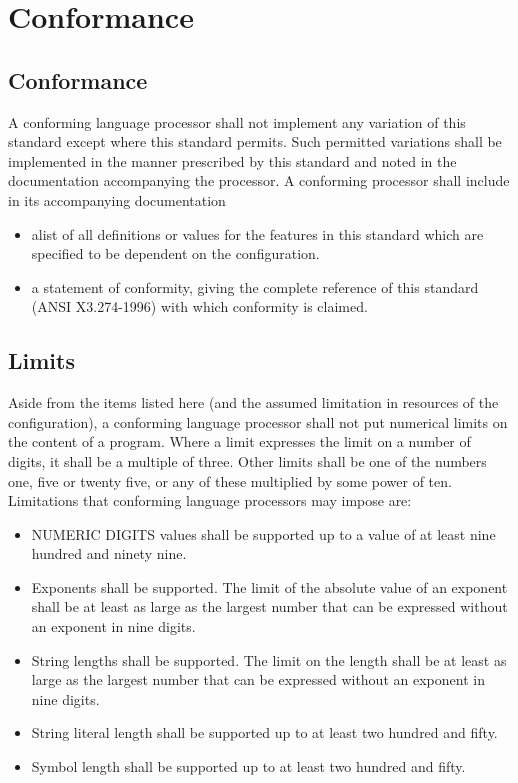 \hypertarget{conformance}{%
\chapter{Conformance}\label{conformance}}

\hypertarget{conformance-1}{%
\section{Conformance}\label{conformance-1}}

A conforming language processor shall not implement any variation of
this standard except where this standard permits. Such permitted
variations shall be implemented in the manner prescribed by this
standard and noted in the documentation accompanying the processor. A
conforming processor shall include in its accompanying documentation

\begin{itemize}
\item
  alist of all definitions or values for the features in this standard
  which are specified to be dependent on the configuration.
\item
  a statement of conformity, giving the complete reference of this
  standard (ANSI X3.274-1996) with which conformity is claimed.
\end{itemize}

\hypertarget{limits}{%
\section{Limits}\label{limits}}

Aside from the items listed here (and the assumed limitation in
resources of the configuration), a conforming language processor shall
not put numerical limits on the content of a program. Where a limit
expresses the limit on a number of digits, it shall be a multiple of
three. Other limits shall be one of the numbers one, five or twenty
five, or any of these multiplied by some power of ten. Limitations that
conforming language processors may impose are:

\begin{itemize}
\item
  NUMERIC DIGITS values shall be supported up to a value of at least
  nine hundred and ninety nine.
\item
  Exponents shall be supported. The limit of the absolute value of an
  exponent shall be at least as large as the largest number that can be
  expressed without an exponent in nine digits.
\item
  String lengths shall be supported. The limit on the length shall be at
  least as large as the largest number that can be expressed without an
  exponent in nine digits.
\item
  String literal length shall be supported up to at least two hundred
  and fifty.
\item
  Symbol length shall be supported up to at least two hundred and fifty.
\end{itemize}
